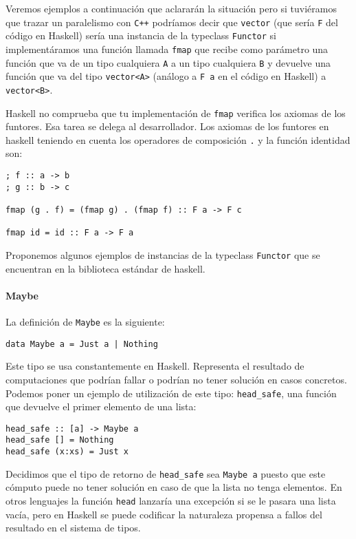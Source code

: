 Veremos ejemplos a continuación que aclararán la situación pero si
tuviéramos que trazar un paralelismo con \texttt{C++} podríamos decir
que \verb~vector~ (que sería \verb~F~ del código en Haskell) sería una
instancia de la typeclass \verb~Functor~ si implementáramos una función
llamada \verb~fmap~ que recibe como parámetro una función que va
de un tipo cualquiera \verb~A~ a un tipo cualquiera \verb~B~ y
devuelve una función que va del tipo \verb~vector<A>~ (análogo a
\verb~F a~ en el código en Haskell) a \verb~vector<B>~.

Haskell no comprueba que tu implementación de \texttt{fmap}
verifica los axiomas de los funtores. Esa tarea se delega al
desarrollador. Los axiomas de los funtores en
haskell teniendo en cuenta los
operadores de composición \verb~.~ y la función identidad son:

\begin{verbatim}
; f :: a -> b
; g :: b -> c

fmap (g . f) = (fmap g) . (fmap f) :: F a -> F c

fmap id = id :: F a -> F a
\end{verbatim}

Proponemos algunos ejemplos de instancias de la typeclass
\verb~Functor~
que se encuentran en la biblioteca estándar
de haskell.

\paragraph{Maybe}
La definición de \verb~Maybe~ es la siguiente:

\begin{verbatim}
data Maybe a = Just a | Nothing
\end{verbatim}

Este tipo se usa constantemente en Haskell. Representa el resultado
de computaciones que podrían fallar o podrían no tener solución en
casos concretos. Podemos poner un ejemplo de
utilización de este tipo: \verb~head_safe~, una
función que devuelve el primer elemento de una lista:

\begin{verbatim}
head_safe :: [a] -> Maybe a
head_safe [] = Nothing
head_safe (x:xs) = Just x
\end{verbatim}

Decidimos que el tipo de retorno de \verb~head_safe~ sea \verb~Maybe a~ puesto
que este cómputo puede no tener solución en caso de que la lista no
tenga elementos. En otros lenguajes la función \verb~head~ lanzaría una
excepción si se le pasara una lista vacía, pero en Haskell se puede
codificar la naturaleza propensa a fallos
del resultado en el sistema de tipos.

